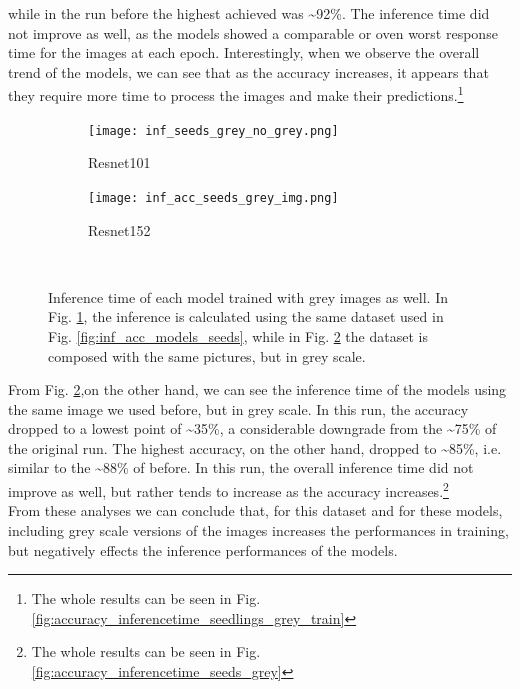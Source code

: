 while in the run before the highest achieved was \textasciitilde92\%. The inference time did not improve as well, as the models showed a comparable or oven worst response time for the images at each epoch. Interestingly, when we observe the overall trend of the models, we can see that as the accuracy increases, it appears that they require more time to process the images and make their predictions.\footnote{The whole results can be seen in Fig. \ref{fig:accuracy_inferencetime_seedlings_grey_train}}\\


\begin{figure}[h]
     \begin{subfigure}{0.5\textwidth}
	    \texttt{[image: inf\_seeds\_grey\_no\_grey.png]}
	    \caption{Resnet101}
         \label{fig:inf_seeds_grey_no_grey}
     \end{subfigure}
     \hfill
     \begin{subfigure}{0.5\textwidth}
	    \texttt{[image: inf\_acc\_seeds\_grey\_img.png]}
	    \caption{Resnet152}
        \label{fig:inf_acc_seeds_grey_img}
     \end{subfigure}\\
     \caption[Inference time of each model trained with grey images as well]{Inference time of each model trained with grey images as well. In Fig. \ref{fig:inf_seeds_grey_no_grey}, the inference is calculated using the same dataset used in Fig. \ref{fig:inf_acc_models_seeds}, while in Fig.  \ref{fig:inf_acc_seeds_grey_img} the dataset is composed with the same pictures, but in grey scale. }
        \label{fig:inf_seeds_with_grey}
\end{figure}


From Fig. \ref{fig:inf_acc_seeds_grey_img},on the other hand, we can see the inference time of the models using the same image we used before, but in grey scale. In this run, the accuracy dropped to a lowest point of \textasciitilde35\%, a considerable downgrade from the \textasciitilde75\% of the original run. The highest accuracy, on the other hand, dropped to \textasciitilde85\%, i.e. similar to the \textasciitilde88\% of before. In this run, the overall inference time did not improve as well, but rather tends to increase as the accuracy increases.\footnote{The whole results can be seen in Fig. \ref{fig:accuracy_inferencetime_seeds_grey}} \\

From these analyses we can conclude that, for this dataset and for these models, including grey scale versions of the images increases the performances in training, but negatively effects the inference performances of the models. 
